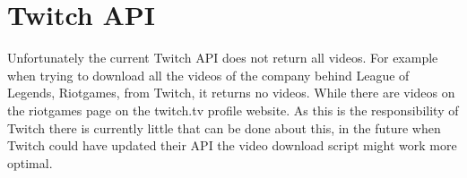 \documentclass[final]{report}
\begin{document}
\section{Twitch API}

Unfortunately the current Twitch API does not return all videos. For example when trying to download all the videos of the company behind League of Legends, Riotgames, from Twitch, it returns no videos. While there are videos on the riotgames page on the twitch.tv profile website. As this is the responsibility of Twitch there is currently little that can be done about this, in the future when Twitch could have updated their API the video download script might work more optimal.
\end{document}
